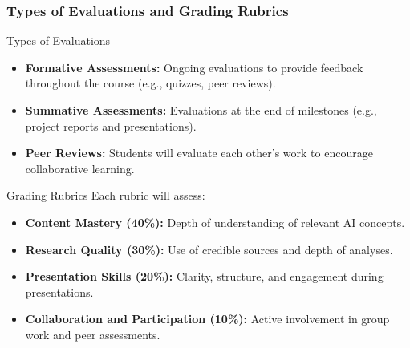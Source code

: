 \documentclass[aspectratio=169]{beamer}
\begin{document}
\begin{frame}[fragile]
    \frametitle{Types of Evaluations and Grading Rubrics}
    \begin{block}{Types of Evaluations}
        \begin{itemize}
            \item \textbf{Formative Assessments:} Ongoing evaluations to provide feedback throughout the course (e.g., quizzes, peer reviews).
            \item \textbf{Summative Assessments:} Evaluations at the end of milestones (e.g., project reports and presentations).
            \item \textbf{Peer Reviews:} Students will evaluate each other’s work to encourage collaborative learning.
        \end{itemize}
    \end{block}
    
    \begin{block}{Grading Rubrics}
        Each rubric will assess:
        \begin{itemize}
            \item \textbf{Content Mastery (40\%):} Depth of understanding of relevant AI concepts.
            \item \textbf{Research Quality (30\%):} Use of credible sources and depth of analyses.
            \item \textbf{Presentation Skills (20\%):} Clarity, structure, and engagement during presentations.
            \item \textbf{Collaboration and Participation (10\%):} Active involvement in group work and peer assessments.
        \end{itemize}
    \end{block}
\end{frame}
\end{document}
